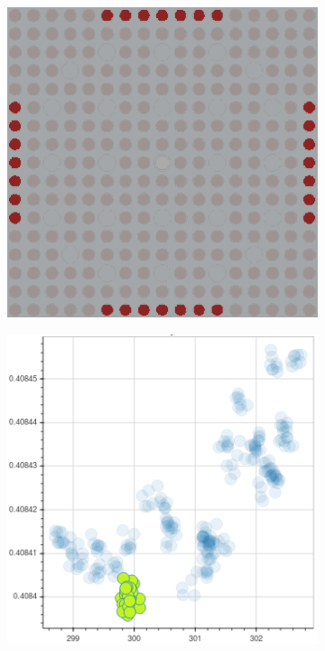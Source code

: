 \begin{figure}[h!]
\begin{subfigure}{0.45\textwidth}
  \caption{}
  \label{fig:chap10-fiss-mean-spect-ind-mgxs}
\end{subfigure}
\begin{subfigure}{0.45\textwidth}
  \centering
  \includegraphics[width=0.9\linewidth]{figures/unsupervised/features/assm-16/u235-fiss/mean-spect-ind/geometry-2}
  \caption{}
  \label{fig:chap10-fiss-mean-spect-ind-geom-2}
\end{subfigure}%
\begin{subfigure}{0.45\textwidth}
  \centering
  \includegraphics[width=0.9\linewidth]{figures/unsupervised/features/assm-16/u235-fiss/mean-spect-ind/mgxs-2}

\end{subfigure}
\end{figure}

